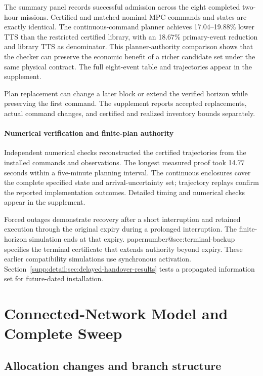 \documentclass[preprint,12pt]{elsarticle}
\makeatletter
\numberwithin{equation}{section}
\newcommand{\papernumber}[1]{\csname papernumber@#1\endcsname}
\makeatother
\begin{document}
The summary panel records successful admission across the eight completed
two-hour missions. Certified and matched nominal MPC commands and states
are exactly identical. The continuous-command planner
achieves 17.04--19.88\% lower TTS than the restricted certified library,
with an 18.67\% primary-event reduction and library TTS as denominator.
This planner-authority comparison shows that the checker can preserve the
economic benefit of a richer candidate set under the same physical contract.
The full eight-event table and trajectories appear in the supplement.

Plan replacement can change a later block or extend the verified horizon while
preserving the first command. The supplement reports accepted replacements, actual command changes,
and certified and realized inventory bounds separately.

\paragraph{Numerical verification and finite-plan authority}
\label{sec:new-numerical-audit}
Independent numerical checks reconstructed the certified trajectories
from the installed commands and observations. The longest measured proof
took 14.77 seconds within a five-minute planning interval. The continuous
enclosures cover the complete specified state and arrival-uncertainty set;
trajectory replays confirm the reported implementation outcomes. Detailed
timing and numerical checks appear in the supplement.

Forced outages demonstrate recovery after a short interruption and retained
execution through the original expiry during a prolonged interruption. The
finite-horizon simulation ends at that expiry. \papernumber{sec:terminal-backup}
specifies the terminal certificate that extends authority beyond expiry.
These earlier compatibility simulations use synchronous activation.
Section~\ref{supp:detail:sec:delayed-handover-results} tests a propagated information set
for future-dated installation.

\FloatBarrier
\section{Connected-Network Model and Complete Sweep}
\label{app:network-transfer}

\subsection{Allocation changes and branch structure}
\end{document}
